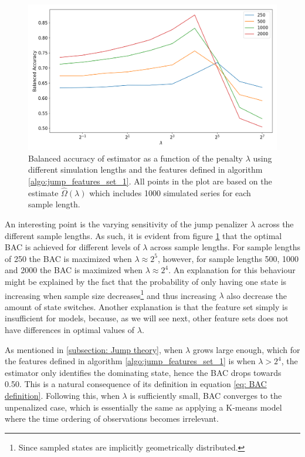 \begin{figure}[H] 
    \centering
    \includegraphics[width=1\textwidth]{analysis/model_convergence/images/jump_penalties_feature_set_1.png}
    \caption[Balanced accuracy of \jump estimator using feature set 1]{Balanced accuracy of \jump estimator as a function of the penalty $\lambda$ using different simulation lengths and the features defined in algorithm \ref{algo:jump_features_set_1}. All points in the plot are based on the estimate $\hat{\Omega} (\lambda)$ which includes 1000 simulated series for each sample length.}
    \label{fig: BAC plot feature set 1}
\end{figure}

An interesting point is the varying sensitivity of the jump penalizer $\lambda$ across the different sample lengths. As such, it is evident from figure \ref{fig: BAC plot feature set 1} that the optimal BAC is achieved for different levels of $\lambda$ across sample lengths. For sample lengths of 250 the BAC is maximized when $\lambda \approx 2^5$, however, for sample lengths 500, 1000 and 2000 the BAC is maximized when $\lambda \approx 2^4$. An explanation for this behaviour might be explained by the fact that the probability of only having one state is increasing when sample size decreases\footnote
{Since sampled states are implicitly geometrically distributed.
}
and thus increasing $\lambda$ also decrease the amount of state switches. Another explanation is that the feature set simply is insufficient for \jump models, because, as we will see next, other feature sets does not have differences in optimal values of $\lambda$.

As mentioned in \cref{subsection: Jump theory}, when $\lambda$ grows large enough, which for the features defined in algorithm \ref{algo:jump_features_set_1} is when $\lambda > 2^4$, the \jump estimator only identifies the dominating state, hence the BAC drops towards 0.50. This is a natural consequence of its definition in equation \ref{eq: BAC definition}. Following this, when $\lambda$ is sufficiently small, BAC converges to the unpenalized case, which is essentially the same as applying a K-means model where the time ordering of observations becomes irrelevant. 

